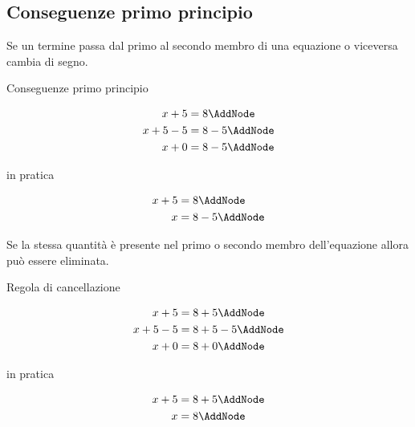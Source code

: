 \subsection{Conseguenze primo principio}
Se un termine passa  dal primo al secondo membro di una equazione o viceversa cambia di segno.
\begin{esempiot}{}{}
Conseguenze primo principio
\end{esempiot}
\begin{NodesList}[dy=5pt,margin=3cm]
 \[ %
 \begin{aligned}
 x+5 &= 8 \AddNode\\
 x +5-5 &= 8-5 \AddNode\\
 x + 0 &= 8-5 \AddNode
 \end{aligned}
 \]
 \end{NodesList}
 in pratica
 \begin{NodesList}[dy=5pt,margin=3cm]
  \[ %
  \begin{aligned}
  x+5 &= 8 \AddNode\\
  x  &= 8-5 \AddNode
  \end{aligned}
  \]
  \end{NodesList}
Se la stessa quantità è presente nel primo o secondo membro dell'equazione allora può essere eliminata.
\begin{esempiot}{}{}
Regola di cancellazione
\end{esempiot}
\begin{NodesList}[dy=5pt,margin=3cm]
 \[ %
 \begin{aligned}
 x+5 &= 8+5 \AddNode\\
 x +5-5 &= 8+5-5 \AddNode\\
 x + 0 &= 8+0 \AddNode
 \end{aligned}
 \]
 \end{NodesList}
 in pratica
 \begin{NodesList}[dy=5pt,margin=3cm]
  \[ %
  \begin{aligned}
  x+5 &= 8+5 \AddNode\\
  x  &= 8 \AddNode
  \end{aligned}
  \]
  \end{NodesList}

